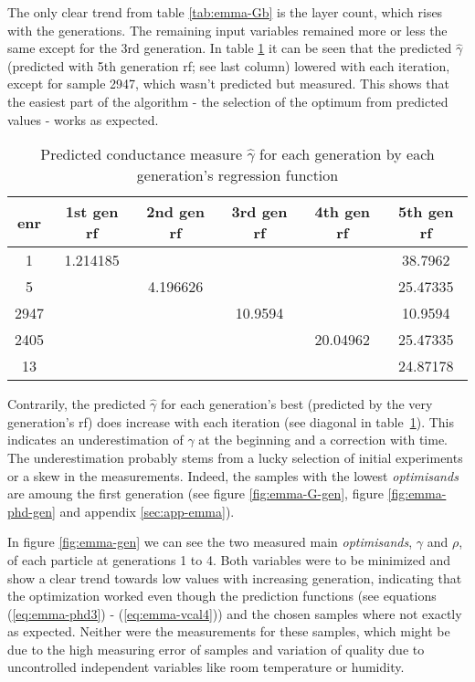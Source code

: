 The only clear trend from table \ref{tab:emma-Gb} is the layer count, which rises with the generations. 
The remaining input variables remained more or less the same except for the 3rd generation. 
%
In table \ref{tab:emma-pred-G} it can be seen that the predicted $\hat{\gamma}$ 
(predicted with 5th generation \gls{rf}; see last column) lowered with each iteration, 
except for sample 2947, which wasn't predicted but measured. 
This shows that the easiest part of the algorithm - the selection of the optimum 
from predicted values - works as expected. 
\begin{table}
	\centering
    \caption{Predicted conductance measure $\hat{\gamma}$ for each generation by each generation's regression function}  
    \label{tab:emma-pred-G}
    \begin{tabular}{cccccc}
        \hline\hline
    enr &1st gen \gls{rf}   &2nd gen \gls{rf} &3rd gen \gls{rf}    &4th gen \gls{rf}   &5th gen \gls{rf}\\
        \hline
    1       &1.214185    &       &       &       &38.7962       \\
    5       &       &4.196626       &       &       &25.47335       \\
    2947    &       &       &10.9594    &       &10.9594       \\
    2405    &       &       &       &20.04962   &25.47335       \\
    13      &       &       &       &       &24.87178   \\
        \hline\hline
    \end{tabular}
\end{table}
%
Contrarily, the predicted $\hat{\gamma}$ for each generation's best 
(predicted by the very generation's \gls{rf}) does increase with each iteration 
(see diagonal in table~\ref{tab:emma-pred-G}). 
This indicates an underestimation of $\hat\gamma$ at the beginning and a correction with time. 
The underestimation probably stems from a lucky selection of initial experiments or a skew in the measurements. 
Indeed, the samples with the lowest \textit{optimisands} are amoung the first generation (see figure \ref{fig:emma-G-gen}, figure \ref{fig:emma-phd-gen} and appendix \ref{sec:app-emma}).

In figure \ref{fig:emma-gen} we can see the two measured main \textit{optimisands}, 
$\gamma$ and $\rho$, of each particle at generations 1 to 4. 
Both variables were to be minimized and show a clear trend towards low values with increasing generation, 
indicating that the optimization worked even though 
the prediction functions (see equations (\ref{eq:emma-phd3}) - (\ref{eq:emma-vcal4})) 
and the chosen samples where not exactly as expected. 
Neither were the measurements for these samples, which might be due to the high measuring error of samples and variation of quality due to uncontrolled independent variables like room temperature or humidity. 


